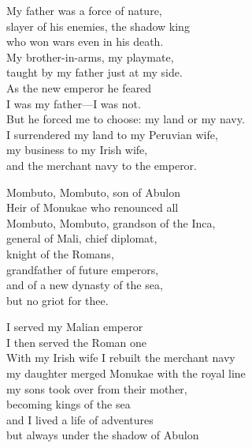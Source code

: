 \begin{lyrics}
My father was a force of nature,\\
slayer of his enemies, the shadow king\\
who won wars even in his death.\\
My brother-in-arms, my playmate,\\
taught by my father just at my side.\\
As the new emperor he feared\\
I was my father—I was not.\\
But he forced me to choose: my land or my navy.\\
I surrendered my land to my Peruvian wife,\\
my business to my Irish wife,\\
and the merchant navy to the emperor.

Mombuto, Mombuto, son of Abulon\\
Heir of Monukae who renounced all\\
Mombuto, Mombuto, grandson of the Inca,\\
general of Mali, chief diplomat,\\
knight of the Romans,\\
grandfather of future emperors,\\
and of a new dynasty of the sea,\\
but no griot for thee.

I served my Malian emperor\\
I then served the Roman one\\
With my Irish wife I rebuilt the merchant navy\\
my daughter merged Monukae with the royal line\\
my sons took over from their mother,\\
becoming kings of the sea\\
and I lived a life of adventures\\
but always under the shadow of Abulon
\end{lyrics}

